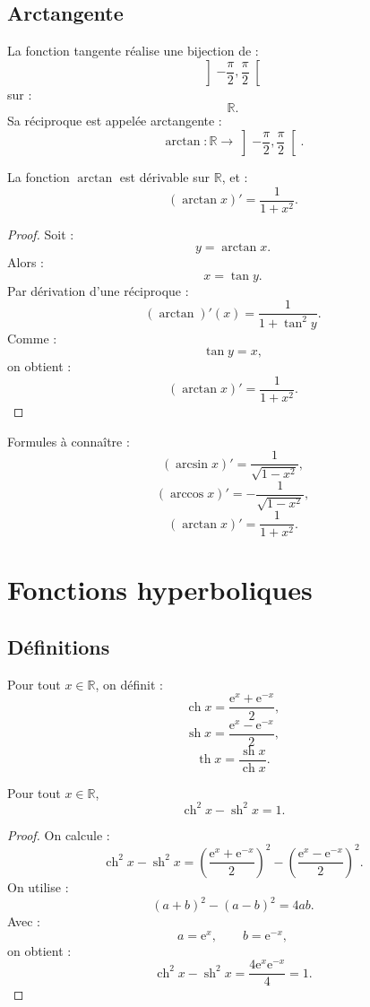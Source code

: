 \documentclass[11pt,a4paper]{article}
\newcommand{\R}{\mathbb R}
\newcommand{\e}{\mathrm e}
\newcommand{\ch}{\operatorname{ch}}
\newcommand{\sh}{\operatorname{sh}}
\renewcommand{\th}{\operatorname{th}}
\begin{document}
\subsection{Arctangente}

\begin{definitionbox}[Arctangente]
La fonction tangente réalise une bijection de :
\[
\left]-\frac{\pi}{2},\frac{\pi}{2}\right[
\]
sur :
\[
\R.
\]
Sa réciproque est appelée arctangente :
\[
\arctan:\R\to\left]-\frac{\pi}{2},\frac{\pi}{2}\right[.
\]
\end{definitionbox}

\begin{theorembox}
La fonction \(\arctan\) est dérivable sur \(\R\), et :
\[
(\arctan x)'=\frac1{1+x^2}.
\]
\end{theorembox}

\begin{proof}
Soit :
\[
y=\arctan x.
\]
Alors :
\[
x=\tan y.
\]
Par dérivation d'une réciproque :
\[
(\arctan)'(x)=\frac1{1+\tan^2 y}.
\]
Comme :
\[
\tan y=x,
\]
on obtient :
\[
(\arctan x)'=\frac1{1+x^2}.
\]
\end{proof}

\begin{retenirbox}
Formules à connaître :
\[
(\arcsin x)'=\frac1{\sqrt{1-x^2}},
\]
\[
(\arccos x)'=-\frac1{\sqrt{1-x^2}},
\]
\[
(\arctan x)'=\frac1{1+x^2}.
\]
\end{retenirbox}

\section{Fonctions hyperboliques}

\subsection{Définitions}

\begin{definitionbox}
Pour tout \(x\in\R\), on définit :
\[
\ch x=\frac{\e^x+\e^{-x}}2,
\]
\[
\sh x=\frac{\e^x-\e^{-x}}2,
\]
\[
\th x=\frac{\sh x}{\ch x}.
\]
\end{definitionbox}

\begin{theorembox}
Pour tout \(x\in\R\),
\[
\ch^2 x-\sh^2 x=1.
\]
\end{theorembox}

\begin{proof}
On calcule :
\[
\ch^2 x-\sh^2 x
=
\left(\frac{\e^x+\e^{-x}}2\right)^2
-
\left(\frac{\e^x-\e^{-x}}2\right)^2.
\]
On utilise :
\[
(a+b)^2-(a-b)^2=4ab.
\]
Avec :
\[
a=\e^x,\qquad b=\e^{-x},
\]
on obtient :
\[
\ch^2 x-\sh^2 x
=
\frac{4\e^x\e^{-x}}4
=
1.
\]
\end{proof}
\end{document}
